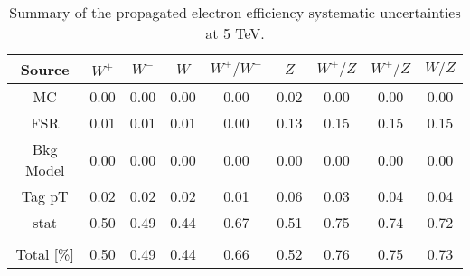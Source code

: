 \begin{table}[htbp]
\begin{center}
\begin{tabular}{ccccccccc}
\hline
Source & $W^+$& $W^-$ & $W$ & $W^+/W^-$ & $Z$ & $W^+/Z$&$W^+/Z$ &$W/Z$  \\
\hline \hline
MC & 0.00 & 0.00 & 0.00 & 0.00 & 0.02 & 0.00 & 0.00 & 0.00 \\
FSR & 0.01 & 0.01 & 0.01 & 0.00 & 0.13 & 0.15 & 0.15 & 0.15 \\
Bkg Model & 0.00 & 0.00 & 0.00 & 0.00 & 0.00 & 0.00 & 0.00 & 0.00 \\
Tag pT & 0.02 & 0.02 & 0.02 & 0.01 & 0.06 & 0.03 & 0.04 & 0.04 \\
stat & 0.50 & 0.49 & 0.44 & 0.67 & 0.51 & 0.75 & 0.74 & 0.72 \\
 \\
\hline \hline
Total [\%] & 0.50 & 0.49 & 0.44 & 0.66 & 0.52 & 0.76 & 0.75 & 0.73 \\

\end{tabular}
\end{center}
\caption{Summary of the propagated electron efficiency systematic uncertainties at 5 TeV.}
\label{tab:Eff:Unc:ele:summary:5}
\end{table}
